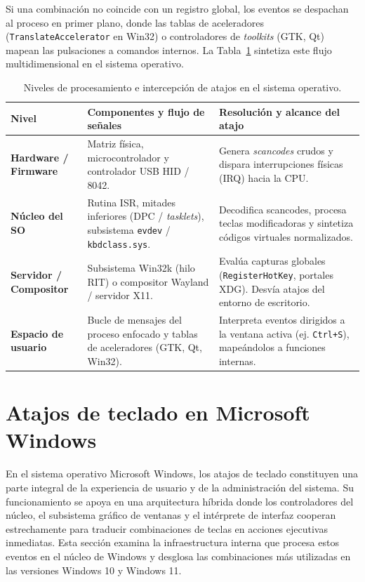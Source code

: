 \documentclass[12pt]{article}
\begin{document}
Si una combinación no coincide con un registro global, los eventos se despachan al proceso en primer plano, donde las tablas de aceleradores (\texttt{TranslateAccelerator} en Win32) o controladores de \textit{toolkits} (GTK, Qt) mapean las pulsaciones a comandos internos. La Tabla~\ref{tab:procesamientoAtajosSo} sintetiza este flujo multidimensional en el sistema operativo.

\begin{table}[htbp]
\centering
\footnotesize
\renewcommand{\arraystretch}{1.1}
\renewcommand{\tabularxcolumn}[1]{m{#1}}
\setlength{\emergencystretch}{1.5em}
\caption{Niveles de procesamiento e intercepción de atajos en el sistema operativo.}
\label{tab:procesamientoAtajosSo}
\begin{tabularx}{\textwidth}{>{\centering\arraybackslash}m{2.8cm} X X}
\toprule
\textbf{Nivel} & \textbf{Componentes y flujo de señales} & \textbf{Resolución y alcance del atajo} \\
\midrule
\textbf{Hardware / Firmware} & Matriz física, microcontrolador y controlador USB HID / 8042. & Genera \textit{scancodes} crudos y dispara interrupciones físicas (IRQ) hacia la CPU. \\
\addlinespace
\textbf{Núcleo del SO} & Rutina ISR, mitades inferiores (DPC / \textit{tasklets}), subsistema \texttt{evdev} / \texttt{kbdclass.sys}. & Decodifica scancodes, procesa teclas modificadoras y sintetiza códigos virtuales normalizados. \\
\addlinespace
\textbf{Servidor / Compositor} & Subsistema Win32k (hilo RIT) o compositor Wayland / servidor X11. & Evalúa capturas globales (\texttt{RegisterHotKey}, portales XDG). Desvía atajos del entorno de escritorio. \\
\addlinespace
\textbf{Espacio de usuario} & Bucle de mensajes del proceso enfocado y tablas de aceleradores (GTK, Qt, Win32). & Interpreta eventos dirigidos a la ventana activa (ej. \texttt{Ctrl+S}), mapeándolos a funciones internas. \\
\bottomrule
\end{tabularx}
\end{table}

\section{Atajos de teclado en Microsoft Windows}
\label{sec:atajosTecladoWindows}

En el sistema operativo Microsoft Windows, los atajos de teclado constituyen una parte integral de la experiencia de usuario y de la administración del sistema. Su funcionamiento se apoya en una arquitectura híbrida donde los controladores del núcleo, el subsistema gráfico de ventanas y el intérprete de interfaz cooperan estrechamente para traducir combinaciones de teclas en acciones ejecutivas inmediatas. Esta sección examina la infraestructura interna que procesa estos eventos en el núcleo de Windows y desglosa las combinaciones más utilizadas en las versiones Windows 10 y Windows 11.
\end{document}
